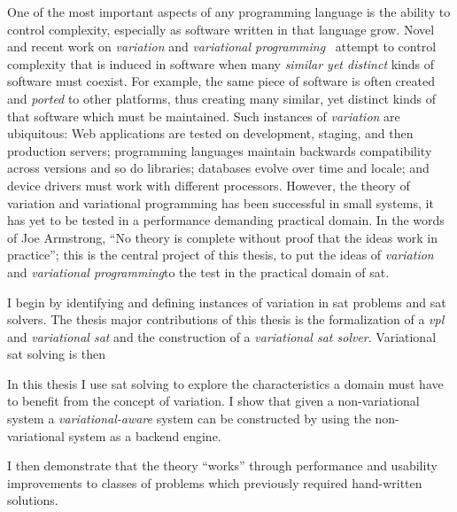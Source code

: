 One of the most important aspects of any programming language is the ability to
control complexity, especially as software written in that language grow. Novel
and recent work on \emph{variation} and \emph{variational
  programming}~\cite{EW11gttse,EW11tosem,HW16fosd,CEW16ecoop,Walk14onward}
attempt to control complexity that is induced in software when many
\emph{similar yet distinct} kinds of software must coexist. For example, the
same piece of software is often created and \emph{ported} to other platforms,
thus creating many similar, yet distinct kinds of that software which must be
maintained. Such instances of \emph{variation} are ubiquitous: Web applications
are tested on development, staging, and then production servers; programming
languages maintain backwards compatibility across versions and so do libraries;
databases evolve over time and locale; and device drivers must work with
different processors. However, the theory of variation and variational
programming has been successful in small systems, it has yet to be tested in a
performance demanding practical domain. In the words of Joe
Armstrong\cite{armstrongThesis}, ``No theory is complete without proof that the
ideas work in practice''; this is the central project of this thesis, to put the
ideas of \emph{variation} and \emph{variational programming}to the test in the
practical domain of \ac{sat}.

I begin by identifying and defining instances of variation in \acl{sat} problems
and \acl{sat} solvers. The thesis major contributions of this thesis is the
formalization of a \emph{\ac{vpl}} and \emph{variational \acl{sat}} and the
construction of a \emph{variational \ac{sat} solver}. Variational \ac{sat}
solving is then

In this thesis I use \ac{sat} solving to explore the characteristics a domain
must have to benefit from the concept of variation. I show that given a
non-variational system a \emph{variational-aware} system can be constructed by
using the non-variational system as a backend engine.


I then demonstrate that the theory ``works'' through
performance and usability improvements to classes of problems which previously
required hand-written solutions.


